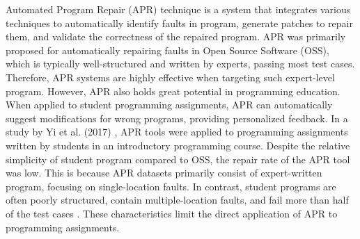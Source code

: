 \documentclass[10pt,conference]{IEEEtran}
\begin{document}
    Automated Program Repair (APR) technique is a system that integrates various techniques to automatically identify faults in program, generate patches to repair them, and validate the correctness of the repaired program. APR was primarily proposed for automatically repairing faults in Open Source Software (OSS), which is typically well-structured and written by experts, passing most test cases. Therefore, APR systems are highly effective when targeting such expert-level program. However, APR also holds great potential in programming education. When applied to student programming assignments, APR can automatically suggest modifications for wrong programs, providing personalized feedback. In a study by Yi et al. (2017) \cite{yi2017feasibility}, APR tools \cite{le2011genprog, weimer2013leveraging, mechtaev2016angelix, long2016automatic} were applied to programming assignments written by students in an introductory programming course. Despite the relative simplicity of student program compared to OSS, the repair rate of the APR tool was low. This is because APR datasets primarily consist of expert-written program, focusing on single-location faults. In contrast, student programs are often poorly structured, contain multiple-location faults, and fail more than half of the test cases \cite{yi2017feasibility}. These characteristics limit the direct application of APR to programming assignments.
\end{document}
